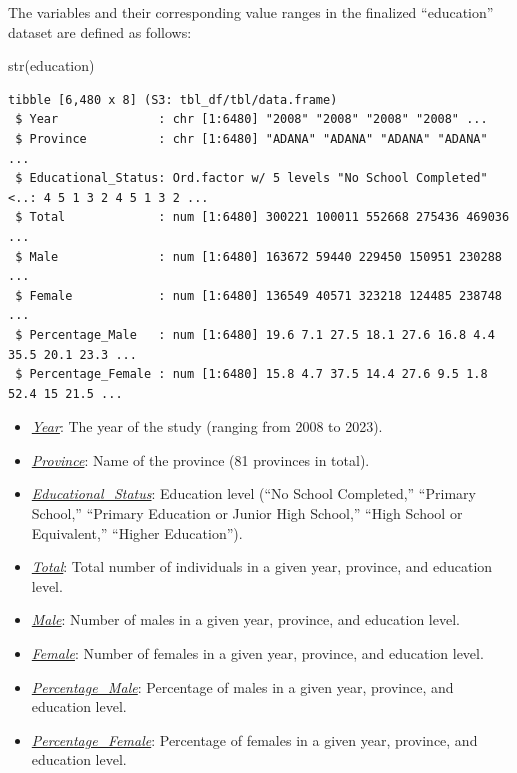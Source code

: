 \documentclass[
  11pt,
  a4paper,
  DIV=11,
  numbers=noendperiod]{scrartcl}
\newenvironment{Shaded}{\begin{snugshade}}{\end{snugshade}}
\newcommand{\FunctionTok}[1]{\textcolor[rgb]{0.28,0.35,0.67}{#1}}
\newcommand{\NormalTok}[1]{\textcolor[rgb]{0.00,0.23,0.31}{#1}}
\begin{document}
The variables and their corresponding value ranges in the finalized
``education'' dataset are defined as follows:

\begin{Shaded}
\begin{Highlighting}[]
 \FunctionTok{str}\NormalTok{(education)}
\end{Highlighting}
\end{Shaded}

\begin{verbatim}
tibble [6,480 x 8] (S3: tbl_df/tbl/data.frame)
 $ Year              : chr [1:6480] "2008" "2008" "2008" "2008" ...
 $ Province          : chr [1:6480] "ADANA" "ADANA" "ADANA" "ADANA" ...
 $ Educational_Status: Ord.factor w/ 5 levels "No School Completed"<..: 4 5 1 3 2 4 5 1 3 2 ...
 $ Total             : num [1:6480] 300221 100011 552668 275436 469036 ...
 $ Male              : num [1:6480] 163672 59440 229450 150951 230288 ...
 $ Female            : num [1:6480] 136549 40571 323218 124485 238748 ...
 $ Percentage_Male   : num [1:6480] 19.6 7.1 27.5 18.1 27.6 16.8 4.4 35.5 20.1 23.3 ...
 $ Percentage_Female : num [1:6480] 15.8 4.7 37.5 14.4 27.6 9.5 1.8 52.4 15 21.5 ...
\end{verbatim}

\begin{itemize}
\item
  \ul{\emph{Year}}: The year of the study (ranging from 2008 to 2023).
\item
  \ul{\emph{Province}}: Name of the province (81 provinces in total).
\item
  \ul{\emph{Educational\_Status}}: Education level (``No School
  Completed,'' ``Primary School,'' ``Primary Education or Junior High
  School,'' ``High School or Equivalent,'' ``Higher Education'').
\item
  \ul{\emph{Total}}: Total number of individuals in a given year,
  province, and education level.
\item
  \ul{\emph{Male}}: Number of males in a given year, province, and
  education level.
\item
  \ul{\emph{Female}}: Number of females in a given year, province, and
  education level.
\item
  \ul{\emph{Percentage\_Male}}: Percentage of males in a given year,
  province, and education level.
\item
  \ul{\emph{Percentage\_Female}}: Percentage of females in a given year,
  province, and education level.
\end{itemize}
\end{document}
